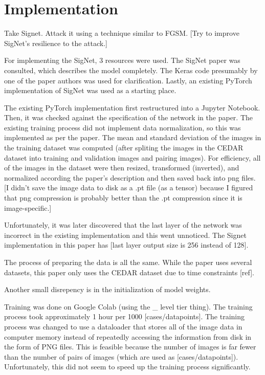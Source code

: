 \section{Implementation}\label{sec:implementation}

Take Signet.
Attack it using a technique similar to FGSM.
[Try to improve SigNet's resilience to the attack.]


For implementing the SigNet, 3 resources were used.
The SigNet paper was consulted, which describes the model completely\cite{sig_net}.
The Keras code presumably by one of the paper authors was used for clarification\cite{GitHub_sounakdey}.
Lastly, an existing PyTorch implementation of SigNet was used as a starting place\cite{GitHub_signet_pytorch}.

The existing PyTorch implementation first restructured into a Jupyter Notebook.
Then, it was checked against the specification of the network in the paper.
The existing training process did not implement data normalization, so this was implemented as per the paper.
The mean and standard deviation of the images in the training dataset was computed (after spliting the images in the CEDAR dataset into training and validation images and pairing images).
For efficiency, all of the images in the dataset were then resized, transformed (inverted), and normalized according the paper's description and then saved back into png files.
[I didn't save the image data to disk as a .pt file (as a tensor) because I figured that png compression is probably better than the .pt compression since it is image-specific.]

Unfortunately, it was later discovered that the last layer of the network was incorrect in the existing implementation and this went unnoticed.
The Signet implementation in this paper has [last layer output size is 256 instead of 128].

The process of preparing the data is all the same.
While the paper uses several datasets, this paper only uses the CEDAR dataset due to time constraints [ref].

Another small disrepency is in the initialization of model weights.

Training was done on Google Colab (using the \_ level tier thing).
The training process took approximately 1 hour per 1000 [cases/datapoints].
The training process was changed to use a dataloader that stores all of the image data in computer memory instead of repeatedly accessing the information from disk in the form of PNG files.
This is feasible because the number of images is far fewer than the number of pairs of images (which are used as [cases/datapoints]).
Unfortunately, this did not seem to speed up the training process significantly.

